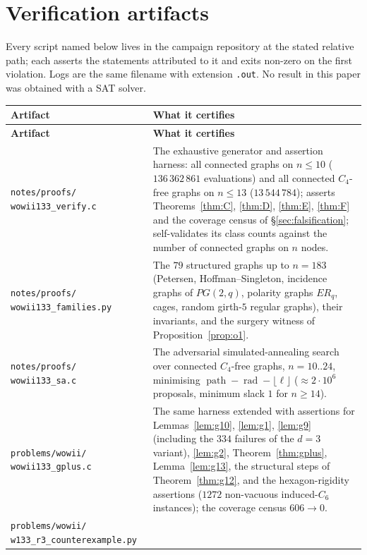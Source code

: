 \documentclass[11pt]{article}
\theoremstyle{plain}
\theoremstyle{definition}
\theoremstyle{remark}
\numberwithin{equation}{section}
\newcommand{\rad}{\operatorname{rad}}
\newcommand{\pth}{\operatorname{path}}
\begin{document}
\appendix

\section{Verification artifacts}\label{app:artifacts}

Every script named below lives in the campaign repository at the stated relative path; each
asserts the statements attributed to it and exits non-zero on the first violation. Logs are
the same filename with extension \texttt{.out}. No result in this paper was obtained with a
SAT solver.

\begin{longtable}{@{}p{}p{}@{}}
\toprule
\textbf{Artifact} & \textbf{What it certifies} \\
\midrule
\endfirsthead
\toprule
\textbf{Artifact} & \textbf{What it certifies} \\
\midrule
\endhead
\texttt{notes/proofs/} \texttt{wowii133\_verify.c} &
The exhaustive generator and assertion harness: all connected graphs on $n \le 10$
($136\,362\,861$ evaluations) and all connected $C_4$-free graphs on $n\le 13$
($13\,544\,784$); asserts Theorems~\ref{thm:C}, \ref{thm:D}, \ref{thm:E}, \ref{thm:F} and the
coverage census of \S\ref{sec:falsification}; self-validates its class counts against the
number of connected graphs on $n$ nodes. \\
\texttt{notes/proofs/} \texttt{wowii133\_families.py} &
The $79$ structured graphs up to $n = 183$ (Petersen, Hoffman--Singleton, incidence graphs of
$PG(2,q)$, polarity graphs $ER_q$, cages, random girth-$5$ regular graphs), their invariants,
and the surgery witness of Proposition~\ref{prop:o1}. \\
\texttt{notes/proofs/} \texttt{wowii133\_sa.c} &
The adversarial simulated-annealing search over connected $C_4$-free graphs,
$n = 10..24$, minimising $\pth-\rad-\lfloor\ell\rfloor$ ($\approx 2\cdot10^6$ proposals,
minimum slack $1$ for $n \ge 14$). \\
\texttt{problems/wowii/} \texttt{wowii133\_gplus.c} &
The same harness extended with assertions for Lemmas~\ref{lem:g10}, \ref{lem:g1},
\ref{lem:g9} (including the $334$ failures of the $d=3$ variant), \ref{lem:g2},
Theorem~\ref{thm:gplus}, Lemma~\ref{lem:g13}, the structural steps of
Theorem~\ref{thm:g12}, and the hexagon-rigidity assertions ($1272$ non-vacuous induced-$C_6$
instances); the coverage census $606 \to 0$. \\
\texttt{problems/wowii/} \texttt{w133\_r3\_counterexample.py} &

\end{longtable}
\end{document}
